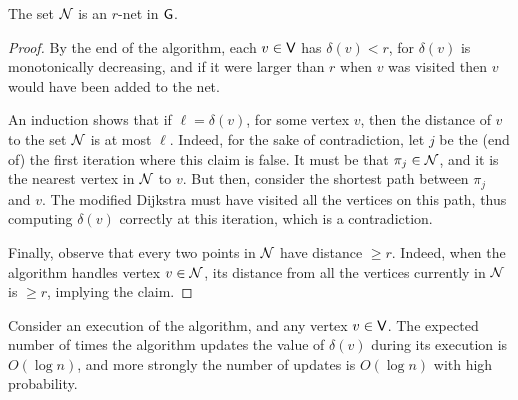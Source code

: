 \begin{lemma}
    The set $\mathcal{N}$ is an $r$-net in $\mathsf{G}$.
\end{lemma}

\begin{proof}
    By the end of the algorithm, each $v \in \mathsf{V}$ has
    $\delta(v) <r$, for $\delta(v)$ is monotonically decreasing, and
    if it were larger than $r$ when $v$ was visited then $v$ would
    have been added to the net.
    
    An induction shows that if $\ell = \delta(v)$, for some vertex
    $v$, then the distance of $v$ to the set $\mathcal{N}$ is at most $\ell$.
    Indeed, for the sake of contradiction, let $j$ be the (end of) the
    first iteration where this claim is false. It must be that
    $\pi_j \in \mathcal{N}$, and it is the nearest vertex in $\mathcal{N}$ to
    $v$. But then, consider the shortest path between $\pi_j$ and
    $v$. The modified Dijkstra must have visited all the vertices on
    this path, thus computing $\delta(v)$ correctly at this iteration,
    which is a contradiction.
    
    Finally, observe that every two points in $\mathcal{N}$ have distance
    $\geq r$. Indeed, when the algorithm handles vertex $v\in \mathcal{N}$,
    its distance from all the vertices currently in $\mathcal{N}$ is
    $\geq r$, implying the claim.
\end{proof}

\begin{lemma}%
    Consider an execution of the algorithm, and any vertex
    $v \in \mathsf{V}$. The expected number of times the algorithm
    updates the value of $\delta(v)$ during its execution is
    $O( \log n )$, and more strongly the number of updates is
    $O(\log n)$ with high probability.
\end{lemma}

